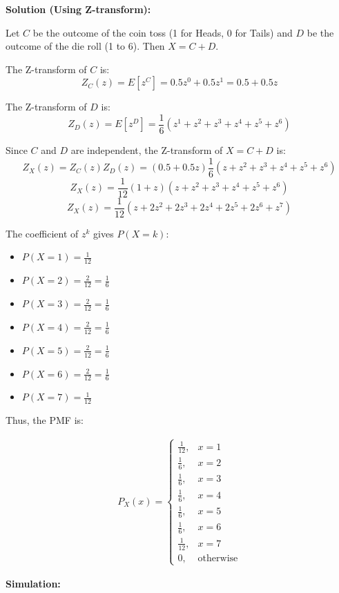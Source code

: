 \documentclass[journal]{IEEEtran}
\begin{document}
\textbf{Solution (Using Z-transform):}

Let $C$ be the outcome of the coin toss (1 for Heads, 0 for Tails) and $D$ be the outcome of the die roll (1 to 6). Then $X = C + D$.

The Z-transform of $C$ is:
$$Z_C(z) = E[z^C] = 0.5z^0 + 0.5z^1 = 0.5 + 0.5z$$

The Z-transform of $D$ is:
$$Z_D(z) = E[z^D] = \frac{1}{6}(z^1 + z^2 + z^3 + z^4 + z^5 + z^6)$$

Since $C$ and $D$ are independent, the Z-transform of $X = C + D$ is:
$$Z_X(z) = Z_C(z)Z_D(z) = (0.5 + 0.5z)\frac{1}{6}(z + z^2 + z^3 + z^4 + z^5 + z^6)$$
$$Z_X(z) = \frac{1}{12}(1 + z)(z + z^2 + z^3 + z^4 + z^5 + z^6)$$
$$Z_X(z) = \frac{1}{12}(z + 2z^2 + 2z^3 + 2z^4 + 2z^5 + 2z^6 + z^7)$$

The coefficient of $z^k$ gives $P(X=k)$:
\begin{itemize}
    \item $P(X=1) = \frac{1}{12}$
    \item $P(X=2) = \frac{2}{12} = \frac{1}{6}$
    \item $P(X=3) = \frac{2}{12} = \frac{1}{6}$
    \item $P(X=4) = \frac{2}{12} = \frac{1}{6}$
    \item $P(X=5) = \frac{2}{12} = \frac{1}{6}$
    \item $P(X=6) = \frac{2}{12} = \frac{1}{6}$
    \item $P(X=7) = \frac{1}{12}$
\end{itemize}

Thus, the PMF is:

\begin{align}
P_X(x) =
\begin{cases}
    \frac{1}{12}, & x = 1 \\
    \frac{1}{6}, & x = 2 \\
    \frac{1}{6},  & x = 3 \\
    \frac{1}{6},  & x = 4 \\
    \frac{1}{6},  & x = 5 \\
    \frac{1}{6},  & x = 6 \\
    \frac{1}{12}, & x = 7 \\
    0, & \text{otherwise}
\end{cases}
\end{align}

\textbf{Simulation:}
\end{document}
